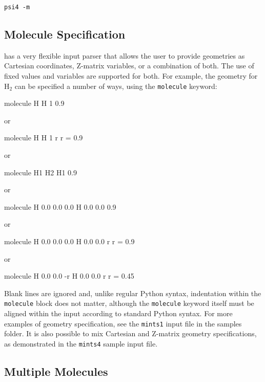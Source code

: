 \begin{verbatim}
psi4 -m
\end{verbatim}

\subsection{Molecule Specification}
\PSIfour has a very flexible input parser that allows the user to provide
geometries as Cartesian coordinates, Z-matrix variables, or a combination of
both. The use of fixed values and variables are supported for both. For
example, the geometry for H$_2$ can be specified a number of ways, using the
{\tt molecule} keyword:
\begin{Snippet}
molecule{
  H
  H 1 0.9
}

 or

molecule{
  H
  H 1 r
  r = 0.9
}

 or

molecule{
  H1
  H2 H1 0.9
}

 or

molecule{
  H 0.0 0.0 0.0
  H 0.0 0.0 0.9
}

 or

molecule{
  H 0.0 0.0 0.0
  H 0.0 0.0 r
  r = 0.9
}

 or

molecule{
  H 0.0 0.0 -r
  H 0.0 0.0 r
  r = 0.45
}
\end{Snippet}
Blank lines are ignored and, unlike regular Python syntax, indentation within
the {\tt molecule} block does not matter, although the {\tt molecule} keyword itself must
be aligned within the input according to standard Python syntax. For more
examples of geometry specification, see the {\tt mints1} input file in the samples
folder. It is also possible to mix Cartesian and Z-matrix geometry
specifications, as demonstrated in the {\tt mints4} sample input file.

\subsection{Multiple Molecules}


